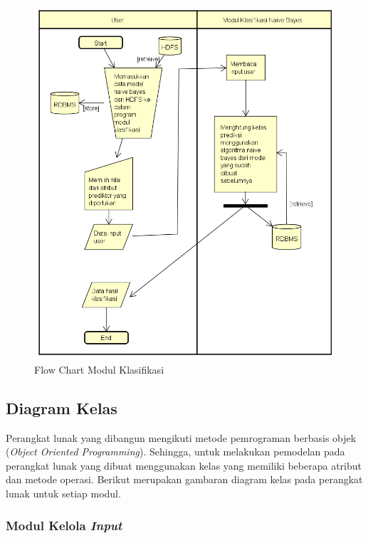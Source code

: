 \begin{figure}[H]
	\centering
	\includegraphics[scale=0.65]{Diagram/Flowchart_Klasifikasi}
	\caption[Flow Chart Modul Klasifikasi]{Flow Chart Modul Klasifikasi}
	\label{fig:Flow Chart Modul Klasifikasi}
\end{figure}

\subsection{Diagram Kelas}

Perangkat lunak yang dibangun mengikuti metode pemrograman berbasis objek (\textit{Object Oriented Programming}). Sehingga, untuk melakukan pemodelan pada perangkat lunak yang dibuat menggunakan kelas yang memiliki beberapa atribut dan metode operasi. Berikut merupakan gambaran diagram kelas pada perangkat lunak untuk setiap modul.

\subsubsection{Modul Kelola \textit{Input}}

